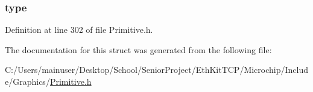 \subsubsection[{type}]{ type}\label{struct_i_m_a_g_e___r_a_m_ad19c8e0d19c638be9dd81d163454b0f1}


Definition at line 302 of file Primitive.\+h.



The documentation for this struct was generated from the following file\+:\begin{DoxyCompactItemize}
\item 
C\+:/\+Users/mainuser/\+Desktop/\+School/\+Senior\+Project/\+Eth\+Kit\+T\+C\+P/\+Microchip/\+Include/\+Graphics/\hyperlink{_primitive_8h}{Primitive.\+h}\end{DoxyCompactItemize}
